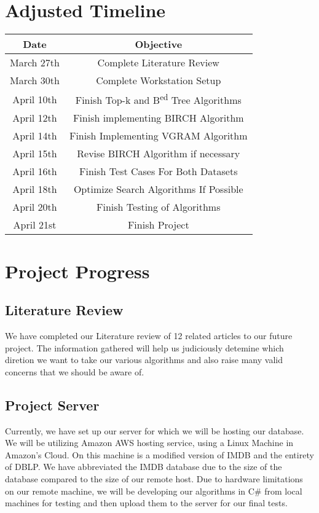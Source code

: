 \documentclass[pdftex,12pt,letter]{article}
\begin{document}
\section{Adjusted Timeline}
\begin{tabular} {| c | c |}
\hline
\bf{Date} & \bf{Objective}\\ \hline
March 27th & Complete Literature Review\\ \hline
March 30th & Complete Workstation Setup\\ \hline
April 10th & Finish Top-k and B\textsuperscript{ed} Tree Algorithms\\ \hline
April 12th & Finish implementing BIRCH Algorithm \\ \hline
April 14th & Finish Implementing VGRAM Algorithm\\ \hline
April 15th & Revise BIRCH Algorithm if necessary\\ \hline
April 16th & Finish Test Cases For Both Datasets\\ \hline
April 18th & Optimize Search Algorithms If Possible\\ \hline
April 20th & Finish Testing of Algorithms\\ \hline
April 21st & Finish Project\\ \hline
\end{tabular}

\section{Project Progress}
\subsection{Literature Review}
We have completed our Literature review of 12 related articles to our future project. The information gathered will help us judiciously detemine which diretion we want to take our various algorithms and also raise many valid concerns that we should be aware of. 
\subsection{Project Server}
Currently, we have set up our server for which we will be hosting our database. We will be utilizing Amazon AWS hosting service, using a Linux Machine in Amazon's Cloud. On this machine is a modified version of IMDB and the entirety of DBLP. We have abbreviated the IMDB database due to the size of the database compared to the size of our remote host. Due to hardware limitations on our remote machine, we will be developing our algorithms in C\# from local machines for testing and then upload them to the server for our final tests.
\end{document}
